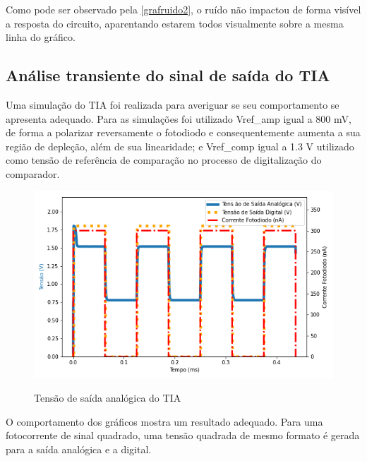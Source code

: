 Como pode ser observado pela \autoref{grafruido2}, o ruído não impactou de forma visível a resposta do circuito, aparentando estarem todos visualmente sobre a mesma linha do gráfico.

\subsection{Análise transiente do sinal de saída do TIA}

Uma simulação do TIA foi realizada para averiguar se seu comportamento se apresenta adequado. Para as simulações foi utilizado Vref\_amp igual a 800 mV, de forma a polarizar reversamente o fotodiodo e consequentemente aumenta a sua região de depleção, além de sua linearidade; e Vref\_comp igual a 1.3 V utilizado como tensão de referência de comparação no processo de digitalização do comparador.

\begin{figure}[!h]
 \centering
    \caption{Tensão de saída analógica do TIA} 
    \includegraphics[scale=0.7]{Resultados/Graficos/tb_clock.png}
    \label{graf_tiasinal}
\end{figure}

O comportamento dos gráficos mostra um resultado adequado. Para uma fotocorrente de sinal quadrado, uma tensão quadrada de mesmo formato é gerada para a saída analógica e a digital.

